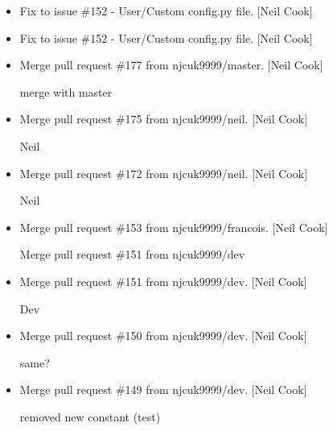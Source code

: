 \documentclass[a4paper,10pt,english]{report}
\begin{document}
\begin{itemize}
\item {} 
Fix to issue \#152 - User/Custom config.py file. {[}Neil Cook{]}

\item {} 
Fix to issue \#152 - User/Custom config.py file. {[}Neil Cook{]}

\item {} 
Merge pull request \#177 from njcuk9999/master. {[}Neil Cook{]}

merge with master

\item {} 
Merge pull request \#175 from njcuk9999/neil. {[}Neil Cook{]}

Neil

\item {} 
Merge pull request \#172 from njcuk9999/neil. {[}Neil Cook{]}

Neil

\item {} 
Merge pull request \#153 from njcuk9999/francois. {[}Neil Cook{]}

Merge pull request \#151 from njcuk9999/dev

\item {} 
Merge pull request \#151 from njcuk9999/dev. {[}Neil Cook{]}

Dev

\item {} 
Merge pull request \#150 from njcuk9999/dev. {[}Neil Cook{]}

same?

\item {} 
Merge pull request \#149 from njcuk9999/dev. {[}Neil Cook{]}

removed new constant (test)

\end{itemize}
\end{document}

